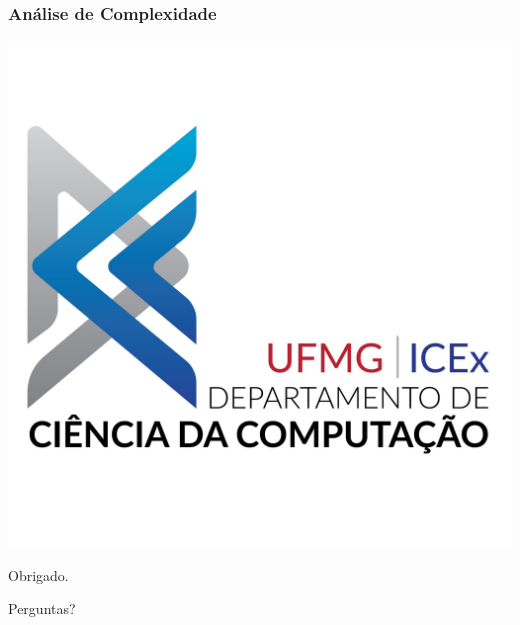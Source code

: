 \documentclass[
	11pt, %
]{beamer}
\begin{document}
\begin{frame}
	\frametitle{Análise de Complexidade}
	
\end{frame}


\begin{frame}[plain] %
	\begin{center}
		
		\includegraphics[width=0.3\linewidth]{logo.png}
		
		\bigskip
		
		{\Huge Obrigado.}
		
		\bigskip\bigskip %
		
		{\LARGE Perguntas?}
	\end{center}
\end{frame}

\end{document}

